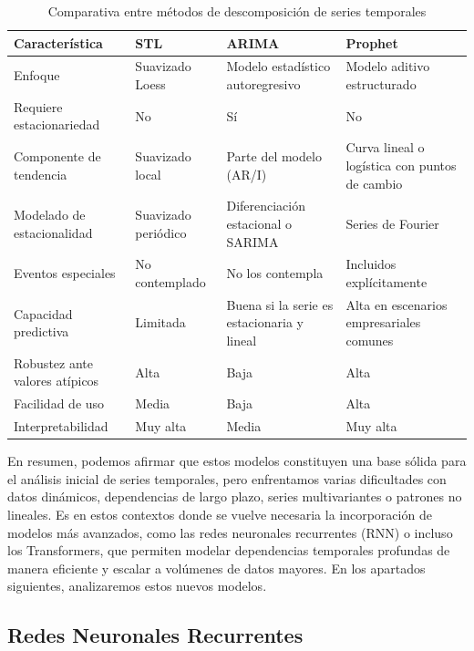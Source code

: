 \begin{table}[H]
	\centering
	\begingroup
	\renewcommand{\arraystretch}{1.055}
	\begin{tabular}{P{3.3cm} | P{2.5cm} P{2.5cm} P{2.5cm}}
		\toprule
		\textbf{Característica} & \textbf{STL} & \textbf{ARIMA} & \textbf{Prophet} \\
		\midrule
		Enfoque & Suavizado Loess & Modelo estadístico autoregresivo & Modelo aditivo estructurado \\
		Requiere estacionariedad & No & Sí & No \\
		Componente de tendencia & Suavizado local & Parte del modelo (AR/I) & Curva lineal o logística con puntos de cambio \\
		Modelado de estacionalidad & Suavizado periódico & Diferenciación estacional o SARIMA & Series de Fourier \\
		Eventos especiales & No contemplado & No los contempla & Incluidos explícitamente \\
		Capacidad predictiva & Limitada & Buena si la serie es estacionaria y lineal & Alta en escenarios empresariales comunes \\
		Robustez ante valores atípicos & Alta & Baja & Alta \\
		Facilidad de uso & Media & Baja & Alta \\
		Interpretabilidad & Muy alta & Media & Muy alta \\
		\bottomrule
	\end{tabular}
	\caption{Comparativa entre métodos de descomposición de series temporales}
	\label{tab:modelsadit}
	\endgroup
\end{table}



En resumen, podemos afirmar que estos modelos constituyen una base sólida para el análisis inicial de series temporales, pero enfrentamos varias dificultades con datos dinámicos, dependencias de largo plazo, series multivariantes o patrones no lineales. Es en estos contextos donde se vuelve necesaria la incorporación de modelos más avanzados, como las {redes neuronales recurrentes (RNN)} o incluso los {Transformers}, que permiten modelar dependencias temporales profundas de manera eficiente y escalar a volúmenes de datos mayores. En los apartados siguientes, analizaremos estos nuevos modelos.

\subsection{Redes Neuronales Recurrentes}

